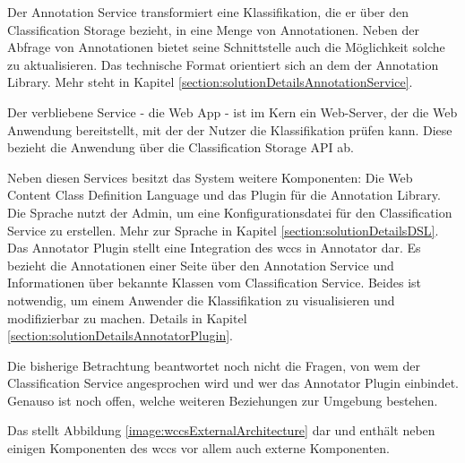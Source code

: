         Der Annotation Service transformiert eine Klassifikation,
        die er über den Classification Storage bezieht,
        in eine Menge von Annotationen.
        Neben der Abfrage von Annotationen bietet seine Schnittstelle auch
        die Möglichkeit solche zu aktualisieren.
        Das technische Format orientiert sich an dem der Annotation Library.
        Mehr steht in Kapitel \ref{section:solutionDetailsAnnotationService}.

        Der verbliebene Service - die Web App - ist im Kern ein Web-Server,
        der die Web Anwendung bereitstellt,
        mit der der Nutzer die Klassifikation prüfen kann.
        Diese bezieht die Anwendung über die Classification Storage API ab.

        Neben diesen Services besitzt das System weitere Komponenten:
        Die Web Content Class Definition Language und das Plugin für die
        Annotation Library.
        Die Sprache nutzt der Admin, um eine Konfigurationsdatei für den
        Classification Service zu erstellen.
        Mehr zur Sprache in Kapitel \ref{section:solutionDetailsDSL}.
        Das Annotator Plugin stellt eine Integration des \gls{wccs} in
        Annotator dar.
        Es bezieht die Annotationen einer Seite über den Annotation Service
        und Informationen über bekannte Klassen vom Classification Service.
        Beides ist notwendig, um einem Anwender die Klassifikation zu visualisieren
        und modifizierbar zu machen.
        Details in Kapitel \ref{section:solutionDetailsAnnotatorPlugin}.

        Die bisherige Betrachtung beantwortet noch nicht die Fragen,
        von wem der Classification Service angesprochen wird und wer das Annotator Plugin einbindet.
        Genauso ist noch offen, welche weiteren Beziehungen zur Umgebung bestehen.

        Das stellt Abbildung \ref{image:wccsExternalArchitecture} dar
        und enthält neben einigen Komponenten des \gls{wccs} vor allem auch
        externe Komponenten.

